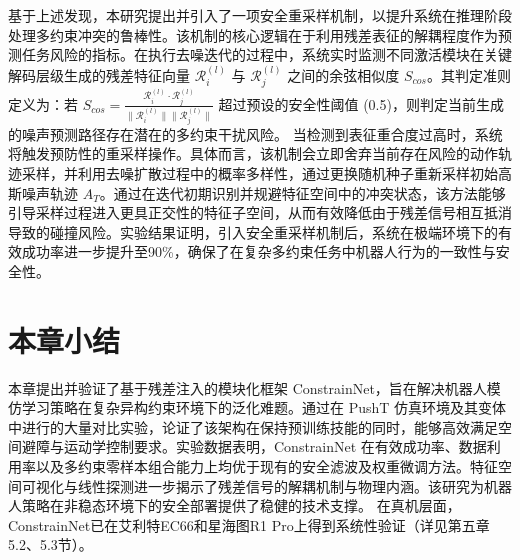 基于上述发现，本研究提出并引入了一项安全重采样机制，以提升系统在推理阶段处理多约束冲突的鲁棒性。该机制的核心逻辑在于利用残差表征的解耦程度作为预测任务风险的指标。在执行去噪迭代的过程中，系统实时监测不同激活模块在关键解码层级生成的残差特征向量 $\mathcal{R}_{i}^{(l)}$ 与 $\mathcal{R}_{j}^{(l)}$ 之间的余弦相似度 $S_{cos}$。其判定准则定义为：若 $S_{cos} = \frac{\mathcal{R}_{i}^{(l)} \cdot \mathcal{R}_{j}^{(l)}}{\|\mathcal{R}_{i}^{(l)}\| \|\mathcal{R}_{j}^{(l)}\|}$ 超过预设的安全性阈值 (0.5)，则判定当前生成的噪声预测路径存在潜在的多约束干扰风险。
当检测到表征重合度过高时，系统将触发预防性的重采样操作。具体而言，该机制会立即舍弃当前存在风险的动作轨迹采样，并利用去噪扩散过程中的概率多样性，通过更换随机种子重新采样初始高斯噪声轨迹 $A_{T}$。通过在迭代初期识别并规避特征空间中的冲突状态，该方法能够引导采样过程进入更具正交性的特征子空间，从而有效降低由于残差信号相互抵消导致的碰撞风险。实验结果证明，引入安全重采样机制后，系统在极端环境下的有效成功率进一步提升至90\%，确保了在复杂多约束任务中机器人行为的一致性与安全性。

\section{本章小结}
本章提出并验证了基于残差注入的模块化框架 ConstrainNet，旨在解决机器人模仿学习策略在复杂异构约束环境下的泛化难题。通过在 PushT 仿真环境及其变体中进行的大量对比实验，论证了该架构在保持预训练技能的同时，能够高效满足空间避障与运动学控制要求。实验数据表明，ConstrainNet 在有效成功率、数据利用率以及多约束零样本组合能力上均优于现有的安全滤波及权重微调方法。特征空间可视化与线性探测进一步揭示了残差信号的解耦机制与物理内涵。该研究为机器人策略在非稳态环境下的安全部署提供了稳健的技术支撑。
在真机层面，ConstrainNet已在艾利特EC66和星海图R1 Pro上得到系统性验证（详见第五章5.2、5.3节）。